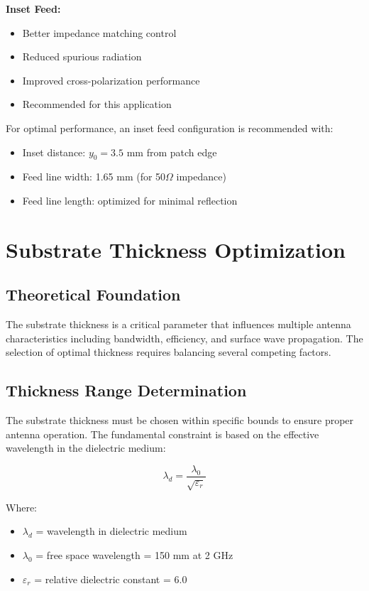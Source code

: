 \documentclass[12pt]{article}
\begin{document}
\textbf{Inset Feed:}
\begin{itemize}
    \item Better impedance matching control
    \item Reduced spurious radiation
    \item Improved cross-polarization performance
    \item Recommended for this application
\end{itemize}

For optimal performance, an inset feed configuration is recommended with:
\begin{itemize}
    \item Inset distance: $y_0 = 3.5$ mm from patch edge
    \item Feed line width: 1.65 mm (for 50$\Omega$ impedance)
    \item Feed line length: optimized for minimal reflection
\end{itemize}

\section{Substrate Thickness Optimization}

\subsection{Theoretical Foundation}

The substrate thickness is a critical parameter that influences multiple antenna characteristics including bandwidth, efficiency, and surface wave propagation. The selection of optimal thickness requires balancing several competing factors.

\subsection{Thickness Range Determination}

The substrate thickness must be chosen within specific bounds to ensure proper antenna operation. The fundamental constraint is based on the effective wavelength in the dielectric medium:

\[\lambda_d = \frac{\lambda_0}{\sqrt{\varepsilon_r}}\]

Where:
\begin{itemize}
    \item $\lambda_d$ = wavelength in dielectric medium
    \item $\lambda_0$ = free space wavelength = 150 mm at 2 GHz
    \item $\varepsilon_r$ = relative dielectric constant = 6.0
\end{itemize}
\end{document}
